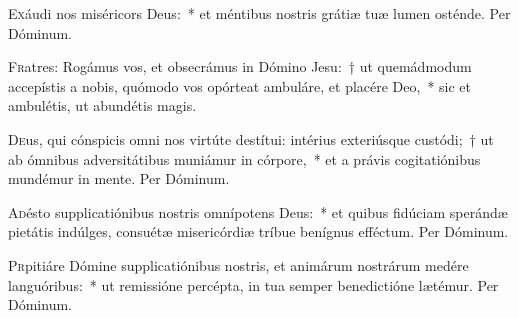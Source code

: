 \documentclass[vesperale_romanum.tex]{subfiles}
\begin{document}
\oratio

\lettrine{E}{x}áudi nos miséricors Deus:~* et méntibus nostris grátiæ tuæ lumen osténde. Per Dóminum.



\lettrine{F}{r}atres: Rogámus vos, et obsecrámus in Dómino Jesu:~† ut quemádmodum accepístis a nobis, quómodo vos opórteat ambuláre, et placére Deo,~* sic et ambulétis, ut abundétis magis.



\oratio

\lettrine{D}{e}us, qui cónspicis omni nos virtúte destítui: intérius exteriúsque custódi;~† ut ab ómnibus adversitátibus muniámur in córpore,~* et a právis cogitatiónibus mundémur in mente. Per Dóminum.






\oratio

\lettrine{A}{d}ésto supplicatiónibus nostris omnípotens Deus:~* et quibus fidúciam sperándæ pietátis indúlges, consuétæ misericórdiæ tríbue benígnus efféctum. Per Dóminum.



\oratio

\lettrine{P}{r}pitiáre Dómine supplicatiónibus nostris, et animárum nostrárum medére languóribus:~* ut remissióne percépta, in tua semper benedictióne lætémur. Per Dóminum.


\end{document}
